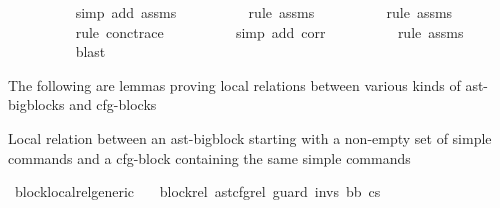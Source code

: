 \begin{isabellebody}
\ \ \ \ \ \ \ \ \isamarkupfalse%
\ {\isacharparenleft}{\kern0pt}simp\ add{\isacharcolon}{\kern0pt}\ assms{\isacharparenright}{\kern0pt}\isanewline
\ \ \ \ \ \ \ \ \isamarkupfalse%
\ {\isacharparenleft}{\kern0pt}rule\ assms{\isacharparenleft}{\kern0pt}{}{\isacharparenright}{\kern0pt}{\isacharparenright}{\kern0pt}\isanewline
\ \ \ \ \ \ \ \ \isamarkupfalse%
\ {\isacharparenleft}{\kern0pt}rule\ assms{\isacharparenleft}{\kern0pt}{}{\isacharparenright}{\kern0pt}{\isacharparenright}{\kern0pt}\isanewline
\ \ \ \ \ \ \ \ \isamarkupfalse%
\ {\isacharparenleft}{\kern0pt}rule\ conc{\isacharunderscore}{\kern0pt}trace{\isacharparenright}{\kern0pt}\isanewline
\ \ \ \ \ \ \ \ \isamarkupfalse%
\ {\isacharparenleft}{\kern0pt}simp\ add{\isacharcolon}{\kern0pt}\ corr{\isacharparenright}{\kern0pt}\isanewline
\ \ \ \ \ \ \ \ \isamarkupfalse%
\ {\isacharparenleft}{\kern0pt}rule\ assms{\isacharparenleft}{\kern0pt}{}{\isacharparenright}{\kern0pt}{\isacharparenright}{\kern0pt}\isanewline
\ \ \ \ \ \ \ \ \isamarkupfalse%
\ blast{\isacharplus}{\kern0pt}\isanewline
\ \ \ \ \ \ \ \ \isamarkupfalse%
\isanewline
\ \ \ \ \isamarkupfalse%
\isanewline
\ \ \isamarkupfalse%
\isanewline
{}\isamarkupfalse%
%
\endisatagproof
{\isafoldproof}%
%
\isadelimproof
%
\endisadelimproof
%
\isadelimdocument
%
\endisadelimdocument
%
\isatagdocument
%
\isamarkuptrue%
%
\endisatagdocument
{\isafolddocument}%
%
\isadelimdocument
%
\endisadelimdocument
%
\begin{isamarkuptext}%
The following are lemmas proving local relations between various kinds of ast-bigblocks and cfg-blocks%
\end{isamarkuptext}\isamarkuptrue%
%
\begin{isamarkuptext}%
Local relation between an ast-bigblock starting with a non-empty set of simple commands and a cfg-block containing the same simple commands%
\end{isamarkuptext}\isamarkuptrue%
\isamarkupfalse%
\ block{\isacharunderscore}{\kern0pt}local{\isacharunderscore}{\kern0pt}rel{\isacharunderscore}{\kern0pt}generic{\isacharcolon}{\kern0pt}\isanewline
\ \ \ block{\isacharunderscore}{\kern0pt}rel{\isacharcolon}{\kern0pt}\ {\isachardoublequoteopen}ast{\isacharunderscore}{\kern0pt}cfg{\isacharunderscore}{\kern0pt}rel\ guard\ invs\ bb\ cs{}{\isachardoublequoteclose}\isanewline

\end{isabellebody}
